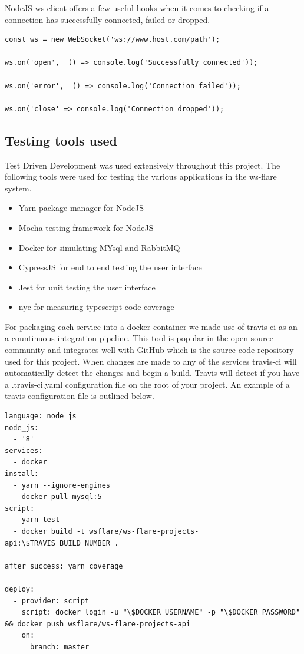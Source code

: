 NodeJS ws client offers a few useful hooks when it comes to checking if a connection has successfully connected, failed or dropped. 

\begin{verbatim}
const ws = new WebSocket('ws://www.host.com/path');
 
ws.on('open',  () => console.log('Successfully connected'));

ws.on('error',  () => console.log('Connection failed'));

ws.on('close' => console.log('Connection dropped'));
\end{verbatim}

\subsection{Testing tools used}

Test Driven Development was used extensively throughout this project. The following tools were used for testing the various applications in the ws-flare system.

\begin{itemize}
  \item Yarn package manager for NodeJS 
  \item Mocha testing framework for NodeJS
  \item Docker for simulating MYsql and RabbitMQ
  \item CypressJS for end to end testing the user interface
  \item Jest for unit testing the user interface
  \item nyc for measuring typescript code coverage
\end{itemize}

For packaging each service into a docker container we made use of \href{https://travis-ci.org/}{travis-ci} as an a countinuous integration pipeline. This tool is popular in the open source community and integrates well with GitHub which is the source code repository used for this project. When changes are made to any of the services travis-ci will automatically detect the changes and begin a build. Travis will detect if you have a .travis-ci.yaml configuration file on the root of your project. An example of a travis configuration file is outlined below.

\begin{verbatim}
language: node_js
node_js:
  - '8'
services:
  - docker
install:
  - yarn --ignore-engines
  - docker pull mysql:5
script:
  - yarn test
  - docker build -t wsflare/ws-flare-projects-api:\$TRAVIS_BUILD_NUMBER .

after_success: yarn coverage

deploy:
  - provider: script
    script: docker login -u "\$DOCKER_USERNAME" -p "\$DOCKER_PASSWORD" && docker push wsflare/ws-flare-projects-api
    on:
      branch: master
\end{verbatim}

